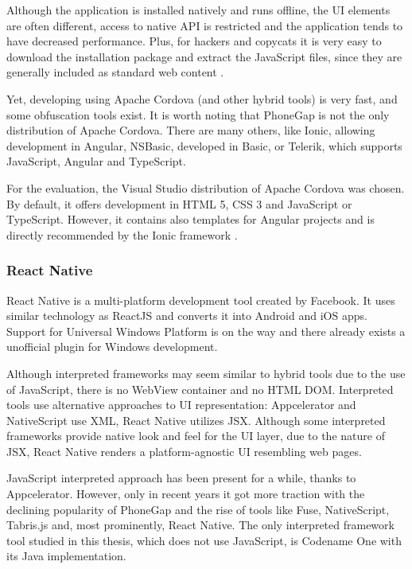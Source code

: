 \documentclass[english,master,public,dept460,male,cpdeclaration,oneside]{diploma}
\begin{document}
Although the application is installed natively and runs offline, the UI elements are often different, access to native API is restricted and the application tends to have decreased performance. Plus, for hackers and copycats it is very easy to download the installation package and extract the JavaScript files, since they are generally included as standard web content \cite{cordovaVsCodename}. 

Yet, developing using Apache Cordova (and other hybrid tools) is very fast, and some obfuscation tools exist. It is worth noting that PhoneGap is not the only distribution of Apache Cordova. There are many others, like Ionic, allowing development in Angular, NSBasic, developed in Basic, or Telerik, which supports JavaScript, Angular and TypeScript.

For the evaluation, the Visual Studio distribution of Apache Cordova was chosen. By default, it offers development in HTML 5, CSS 3 and JavaScript or TypeScript. However, it contains also templates for Angular projects and is directly recommended by the Ionic framework \cite{ionicGetStarted}. 

\subsubsection{React Native}
React Native is a multi-platform development tool created by Facebook. It uses similar technology as ReactJS and converts it into Android and iOS apps. Support for Universal Windows Platform is on the way and there already exists a unofficial plugin for Windows development\cite{npmReactNativeWindows}.

Although interpreted frameworks may seem similar to hybrid tools due to the use of JavaScript, there is no WebView container and no HTML DOM. Interpreted tools use alternative approaches to UI representation: Appcelerator and NativeScript use XML, React Native utilizes JSX. Although some interpreted frameworks provide native look and feel for the UI layer, due to the nature of JSX, React Native renders a platform-agnostic UI resembling web pages. 

JavaScript interpreted approach has been present for a while, thanks to Appcelerator. However, only in recent years it got more traction with the declining popularity of PhoneGap and the rise of tools like Fuse, NativeScript, Tabris.js and, most prominently, React Native. The only interpreted framework tool studied in this thesis, which does not use JavaScript, is Codename One with its Java implementation.
\end{document}

